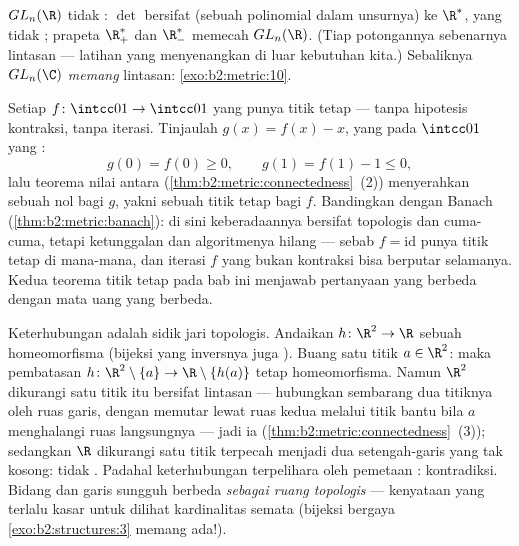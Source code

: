 \begin{example}\label{ex:b2:metric:glnr}
$GL_n(\R)$ tidak : $\det$ bersifat  (sebuah polinomial
dalam unsurnya) ke $\R^*$, yang tidak ; prapeta
$\R_+^*$ dan $\R_-^*$ memecah $GL_n(\R)$. (Tiap potongannya sebenarnya
 lintasan --- latihan yang menyenangkan di luar kebutuhan
kita.) Sebaliknya $GL_n(\C)$ \emph{memang}  lintasan:
\cref{exo:b2:metric:10}.
\end{example}

\begin{example}\label{ex:b2:metric:ivtfixed}
Setiap $f \colon \intcc01 \to \intcc01$ yang  punya titik
tetap --- tanpa hipotesis kontraksi, tanpa iterasi. Tinjaulah
$g(x) = f(x) - x$, yang  pada $\intcc01$ yang :
\[
g(0) = f(0) \geq 0,
\qquad
g(1) = f(1) - 1 \leq 0 ,
\]
lalu teorema nilai antara
(\cref{thm:b2:metric:connectedness}~(2)) menyerahkan sebuah nol bagi
$g$, yakni sebuah titik tetap bagi $f$. Bandingkan dengan Banach
(\cref{thm:b2:metric:banach}): di sini keberadaannya bersifat topologis
dan cuma-cuma, tetapi ketunggalan dan algoritmenya hilang --- sebab $f =
\mathrm{id}$ punya titik tetap di mana-mana, dan iterasi $f$ yang
bukan kontraksi bisa berputar selamanya. Kedua teorema titik tetap pada
bab ini menjawab pertanyaan yang berbeda dengan mata uang yang berbeda.
\end{example}

\begin{example}\label{ex:b2:metric:rnotr2}
Keterhubungan adalah sidik jari topologis. Andaikan $h \colon
\R^2 \to \R$ sebuah homeomorfisma (bijeksi  yang inversnya juga
). Buang satu titik $a \in \R^2$: maka
pembatasan $h \colon \R^2\setminus\{a\} \to
\R\setminus\{h(a)\}$ tetap homeomorfisma. Namun $\R^2$ dikurangi
satu titik itu bersifat  lintasan --- hubungkan sembarang dua
titiknya oleh ruas garis, dengan memutar lewat ruas kedua melalui titik
bantu bila $a$ menghalangi ruas langsungnya --- jadi ia 
(\cref{thm:b2:metric:connectedness}~(3)); sedangkan $\R$ dikurangi
satu titik terpecah menjadi dua setengah-garis  yang tak kosong:
tidak . Padahal keterhubungan terpelihara oleh pemetaan :
kontradiksi. Bidang dan garis sungguh berbeda \emph{sebagai
ruang topologis} --- kenyataan yang terlalu kasar untuk dilihat
kardinalitas semata (bijeksi bergaya
\cref{exo:b2:structures:3} memang ada!).
\end{example}

